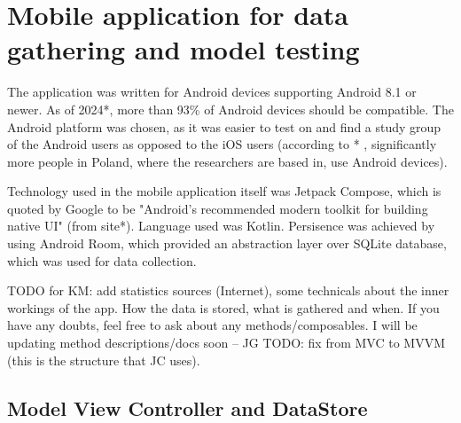 
\section{Mobile application for data gathering and model testing}

The application was written for Android devices supporting Android 8.1 or newer. As of 2024*, more than 93\% of Android devices should be compatible. The Android platform was chosen, as it was easier to test on and find a study group of the Android users as opposed to the iOS users (according to * , significantly more people in Poland, where the researchers are based in, use Android devices).

Technology used in the mobile application itself was Jetpack Compose, which is quoted by Google to be "Android’s recommended modern toolkit for building native UI" (from site*). Language used was Kotlin. Persisence was achieved by using Android Room, which provided an abstraction layer over SQLite database, which was used for data collection.

TODO for KM: add statistics sources (Internet), some technicals about the inner workings of the app. How the data is stored, what is gathered and when. If you have any doubts, feel free to ask about any methods/composables. I will be updating method descriptions/docs soon -- JG
TODO: fix from MVC to MVVM (this is the structure that JC uses).

\subsection{Model View Controller and DataStore}

